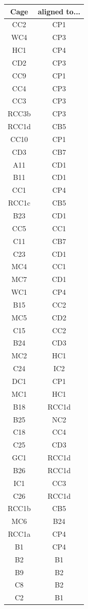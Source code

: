 \documentclass[journal=jacsat,manuscript=article]{achemso}
\begin{document}
\begin{longtable}{cc}
\hline
 \textbf{Cage}  & \textbf{aligned to...}  \\
 \hline
 CC2 & CP1\\
 WC4 & CP3\\
 HC1 & CP4\\
 CD2 & CP3\\
 CC9 & CP1\\
 CC4 & CP3\\
 CC3 & CP3\\
 RCC3b & CP3\\
 RCC1d & CB5\\
 CC10 & CP1\\
 CD3 & CB7\\
 A11 & CD1\\
 B11 & CD1\\
 CC1 & CP4\\
 RCC1c & CB5\\
 B23 & CD1\\
 CC5 & CC1\\
 C11 & CB7\\
 C23 & CD1\\
 MC4 & CC1\\
 MC7 & CD1\\
 WC1 & CP4\\
 B15 & CC2\\
 MC5 & CD2\\
 C15 & CC2\\
 B24 & CD3\\
 MC2 & HC1\\
 C24 & IC2\\
 DC1 & CP1\\
 MC1 & HC1\\
 B18 & RCC1d\\
 B25 & NC2\\
 C18 & CC4\\
 C25 & CD3\\
 GC1 & RCC1d\\
 B26 & RCC1d\\
 IC1 & CC3\\
 C26 & RCC1d\\
 RCC1b & CB5\\
 MC6 & B24\\
 RCC1a & CP4\\
 B1 & CP4\\
 B2 & B1\\
 B9 & B2\\
 C8 & B2\\
 C2 & B1\\

\end{longtable}
\end{document}
